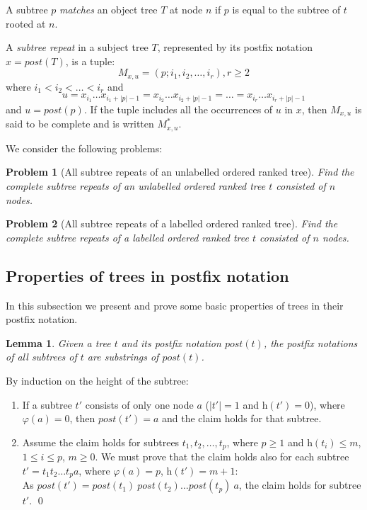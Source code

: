 \documentclass[preprint,12pt]{elsarticle}
\newtheorem{problem}{Problem}
\newtheorem{lemma}[theorem]{Lemma}
\newenvironment{proof}[1][Proof]{\begin{trivlist}
\item[\hskip \labelsep {\bfseries #1}]}{\end{trivlist}}
\begin{document}
A subtree $p$ {\em matches} an object tree $T$ at node $n$ if $p$ is equal to 
the subtree of $t$ rooted at $n$.

A \emph{subtree repeat} in a subject tree $T$, represented by its postfix notation $x = \textit{post}(T)$, is a tuple:
$$ M_{x,u} = (p; i_1,i_2,\ldots,i_r), r \geq 2$$
where $i_1 < i_2 < \ldots < i_r$ and
$$ u = x_{i_1} \ldots x_{i_1 + |p| - 1} = x_{i_2} \ldots x_{i_2 + |p| - 1} = \ldots = x_{i_r} \ldots x_{i_r + |p| - 1} $$
and $u = \textit{post}(p)$.
If the tuple includes all the occurrences of $u$ in $x$, then $M_{x,u}$ is said to be complete
and is written $M^*_{x,u}$.


We consider the following problems:

\begin{problem}[All subtree repeats of an unlabelled ordered ranked tree]
\label{problem:unlabeled}
Find the complete subtree repeats of an unlabelled ordered ranked tree $t$ consisted of $n$ nodes.
\end{problem}

\begin{problem}[All subtree repeats of a labelled ordered ranked tree]
\label{problem:labeled}
Find the complete subtree repeats of a labelled ordered ranked tree $t$ consisted of $n$ nodes.
\end{problem}

\subsection{Properties of trees in postfix notation}
\label{Prop}

In this subsection we present and prove some basic properties of trees in their postfix notation.
\begin{lemma}\label{lem:1}
Given a tree $t$ and its postfix notation $\textit{post}(t)$, the postfix notations of all subtrees of $t$ are substrings of $\textit{post}(t)$.
\end{lemma}
\begin{proof}
By induction on the height of the subtree:
\begin{enumerate}
\item If a subtree $t'$ consists of only one node $a$ ($|t'|=1$ and $\textit{h}(t') = 0$), where $\varphi(a) = 0$, 
then $\textit{post}(t')=a$ and the claim holds for that subtree.
\item Assume the claim holds for subtrees $t_1,t_2, \ldots ,t_p$, where $p \geq 1$ and $\textit{h}(t_i) \leq m$, $1 \leq i \leq p$, $m \geq 0$.
We must prove that the claim holds also for each subtree $t'= t_1 t_2
\ldots t_p a$, where $\varphi(a)=p$, $\textit{h}(t')= m+1$:\\ 
As $\textit{post}(t')= \textit{post}(t_1)\ \textit{post}(t_2) \ldots
\textit{post}(t_p)\ a$, the claim holds for subtree $t'$. \qed
\end{enumerate}
\end{proof}
\end{document}
